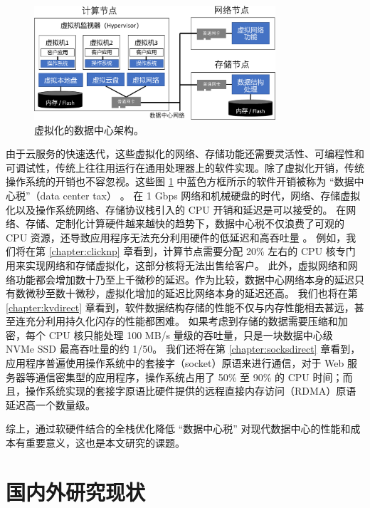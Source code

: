 \begin{figure}[htbp]
	\centering
	\includegraphics[width=0.8\textwidth]{figures/virt_arch.pdf}
	\caption{虚拟化的数据中心架构。}
	\label{intro:fig:virt-architecture}
\end{figure}


由于云服务的快速迭代，这些虚拟化的网络、存储功能还需要灵活性、可编程性和可调试性，传统上往往用运行在通用处理器上的软件实现。除了虚拟化开销，传统操作系统的开销也不容忽视。这些图 \ref{intro:fig:virt-architecture} 中蓝色方框所示的软件开销被称为 ``数据中心税''（data center tax） \cite{barroso2009datacenter,barroso2013datacenter,barroso2018datacenter}。
在 1 Gbps 网络和机械硬盘的时代，网络、存储虚拟化以及操作系统网络、存储协议栈引入的 CPU 开销和延迟是可以接受的。
在网络、存储、定制化计算硬件越来越快的趋势下，数据中心税不仅浪费了可观的 CPU 资源，还导致应用程序无法充分利用硬件的低延迟和高吞吐量 \cite{barroso2017attack}。
例如，我们将在第 \ref{chapter:clicknp} 章看到，计算节点需要分配 20\% 左右的 CPU 核专门用来实现网络和存储虚拟化，这部分核将无法出售给客户。
此外，虚拟网络和网络功能都会增加数十乃至上千微秒的延迟。作为比较，数据中心网络本身的延迟只有数微秒至数十微秒，虚拟化增加的延迟比网络本身的延迟还高。
我们也将在第 \ref{chapter:kvdirect} 章看到，软件数据结构存储的性能不仅与内存性能相去甚远，甚至连充分利用持久化闪存的性能都困难。
如果考虑到存储的数据需要压缩和加密，每个 CPU 核只能处理 100 MB/s 量级的吞吐量，只是一块数据中心级 NVMe SSD 最高吞吐量的约 1/50。
我们还将在第 \ref{chapter:socksdirect} 章看到，应用程序普遍使用操作系统中的套接字（socket）原语来进行通信，对于 Web 服务器等通信密集型的应用程序，操作系统占用了 50\% 至 90\% 的 CPU 时间；而且，操作系统实现的套接字原语比硬件提供的远程直接内存访问（RDMA）原语延迟高一个数量级。

综上，通过软硬件结合的全栈优化降低 ``数据中心税'' 对现代数据中心的性能和成本有重要意义，这也是本文研究的课题。





\section{国内外研究现状}


